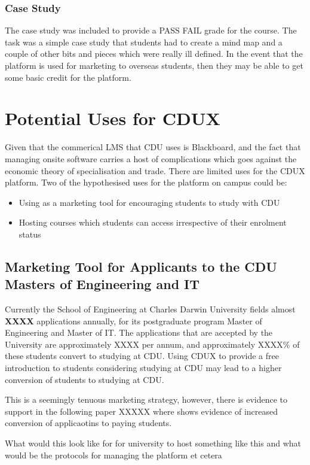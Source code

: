 \documentclass[a4paper]{article}
\begin{document}
\subsubsection{Case Study}
The case study was included to provide a PASS FAIL grade for the course. The task was a simple case study that students had to create a mind map and a couple of other bits and pieces which were really ill defined. In the event that the platform is used for marketing to overseas students, then they may be able to get some basic credit for the platform.

\section{Potential Uses for CDUX}
Given that the commerical LMS that CDU uses is Blackboard, and the fact that managing onsite software carries a host of complications which goes against the economic theory of specialisation and trade. There are limited uses for the CDUX platform. Two of the hypothesised uses for the platform on campus could be:
\begin{itemize}
\item Using as a marketing tool for encouraging students to study with CDU
\item Hosting courses which students can access irrespective of their enrolment status
\end{itemize}

\subsection{Marketing Tool for Applicants to the CDU Masters of Engineering and IT}
Currently the School of Engineering at Charles Darwin University fields almost \textbf{XXXX} applications annually, for its postgraduate program Master of Engineering and Master of IT. The applications that are accepted by the University are approximately XXXX per annum, and approximately XXXX\% of these students convert to studying at CDU. Using CDUX to provide a free introduction to students considering studying at CDU may lead to a higher conversion of students to studying at CDU.

This is a seemingly tenuous marketing strategy, however, there is evidence to support in the following paper XXXXX where shows evidence of increased conversion of applicaotins to paying students.  

What would this look like for for university to host something like this and what would be the protocols for managing the platform et cetera
\end{document}
